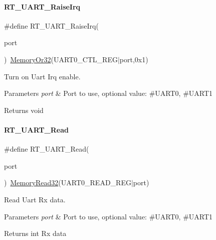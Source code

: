 \paragraph{\texorpdfstring{R\+T\+\_\+\+U\+A\+R\+T\+\_\+\+Raise\+Irq}{RT\_UART\_RaiseIrq}}
{\footnotesize\ttfamily \#define R\+T\+\_\+\+U\+A\+R\+T\+\_\+\+Raise\+Irq(\begin{DoxyParamCaption}\item[{}]{port }\end{DoxyParamCaption})~\mbox{\hyperlink{a00020_a9ea92ebccdef6bdaca4d00210cc7266d}{Memory\+Or32}}(U\+A\+R\+T0\+\_\+\+C\+T\+L\+\_\+\+R\+EG$\vert$port,0x1)}



Turn on Uart Irq enable. 


\begin{DoxyParams}{Parameters}
{\em port} & Port to use, optional value\+: \#\+U\+A\+R\+T0, \#\+U\+A\+R\+T1 \\
\hline
\end{DoxyParams}
\begin{DoxyReturn}{Returns}
void 
\end{DoxyReturn}
\mbox{\label{a00056_a7804645fb092b24545278660f6b66409}} 
\paragraph{\texorpdfstring{R\+T\+\_\+\+U\+A\+R\+T\+\_\+\+Read}{RT\_UART\_Read}}
{\footnotesize\ttfamily \#define R\+T\+\_\+\+U\+A\+R\+T\+\_\+\+Read(\begin{DoxyParamCaption}\item[{}]{port }\end{DoxyParamCaption})~\mbox{\hyperlink{a00020_a706b02571285f92589fbb0b964d7d0bb}{Memory\+Read32}}(U\+A\+R\+T0\+\_\+\+R\+E\+A\+D\+\_\+\+R\+EG$\vert$port)}



Read Uart Rx data. 


\begin{DoxyParams}{Parameters}
{\em port} & Port to use, optional value\+: \#\+U\+A\+R\+T0, \#\+U\+A\+R\+T1 \\
\hline
\end{DoxyParams}
\begin{DoxyReturn}{Returns}
int Rx data 
\end{DoxyReturn}
\mbox{\label{a00056_a565befb27caf782083358e0ad81af3a3}} 
